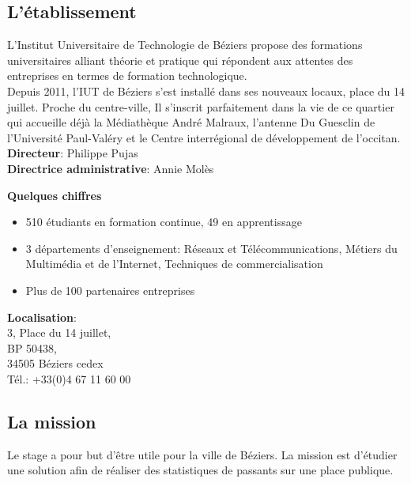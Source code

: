 \documentclass[12pt, french]{report}
\begin{document}
\subsection*{L'établissement}

L'Institut Universitaire de Technologie de Béziers propose des formations universitaires alliant théorie et pratique qui répondent aux attentes des entreprises en termes de formation technologique. \\

Depuis 2011, l’IUT de Béziers s’est installé dans ses nouveaux locaux, place du 14 juillet. Proche du centre-ville, Il s’inscrit parfaitement dans la vie de ce quartier qui accueille déjà la Médiathèque André Malraux, l’antenne Du Guesclin de l’Université Paul-Valéry et le Centre interrégional de développement de l’occitan.\\

\textbf{Directeur}: Philippe Pujas\\

\textbf{Directrice administrative}: Annie Molès\\
\bigskip

\textbf{Quelques chiffres}\\
\begin{itemize}
        \item 510 étudiants en formation continue, 49 en apprentissage
        \item 3 départements d'enseignement: Réseaux et Télécommunications, Métiers du Multimédia et de l'Internet, Techniques de commercialisation
        \item Plus de 100 partenaires entreprises\\
\end{itemize} 


\textbf{Localisation}:\\ 3, Place du 14 juillet,\\ BP 50438,\\ 34505 Béziers cedex\\ Tél.: +33(0)4 67 11 60 00


\subsection*{La mission}
    
Le stage a pour but d'être utile pour la ville de Béziers. La mission est d'étudier une solution  afin de réaliser des statistiques de passants sur une place publique. \\
\end{document}
